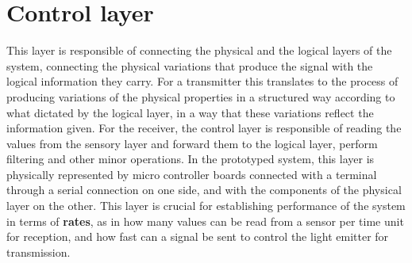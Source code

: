 \section{Control layer}

This layer is responsible of connecting the physical and the logical layers of the system, connecting the physical variations that produce the signal with the logical information they carry.
For a transmitter this translates to the process of producing variations of the physical properties in a structured way according to what dictated by the logical layer, in a way that these variations reflect the information given.
For the receiver, the control layer is responsible of reading the values from the sensory layer and forward them to the logical layer, perform filtering and other minor operations.
In the prototyped system, this layer is physically represented by micro controller boards connected with a terminal through a serial connection on one side, and with the components of the physical layer on the other.
This layer is crucial for establishing performance of the system in terms of \textbf{rates}, as in how many values can be read from a sensor per time unit for reception, and how fast can a signal be sent to control the light emitter for transmission.

